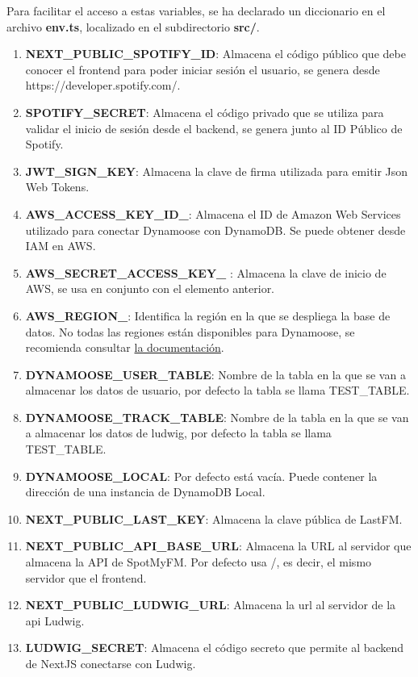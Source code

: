 Para facilitar el acceso a estas variables, se ha declarado un diccionario en el archivo \textbf{env.ts}, localizado en el subdirectorio \textbf{src/}.

\begin{enumerate}
    \item \textbf{NEXT\_PUBLIC\_SPOTIFY\_ID}: Almacena el código público que debe conocer el frontend para poder iniciar sesión el usuario, se genera desde https://developer.spotify.com/.
    \item \textbf{SPOTIFY\_SECRET}: Almacena el código privado que se utiliza para validar el inicio de sesión desde el backend, se genera junto al ID Público de Spotify. 
    \item \textbf{JWT\_SIGN\_KEY}: Almacena la clave de firma utilizada para emitir Json Web Tokens.
    \item \textbf{AWS\_ACCESS\_KEY\_ID\_}: Almacena el ID de Amazon Web Services utilizado para conectar Dynamoose con DynamoDB. Se puede obtener desde IAM en AWS.
    \item \textbf{AWS\_SECRET\_ACCESS\_KEY\_ }: Almacena la clave de inicio de AWS, se usa en conjunto con el elemento anterior.
    \item \textbf{AWS\_REGION\_}: Identifica la región en la que se despliega la base de datos. No todas las regiones están disponibles para Dynamoose, se recomienda consultar \href{https://docs.aws.amazon.com/AmazonRDS/latest/UserGuide/Concepts.RegionsAndAvailabilityZones.html}{la documentación}.
    \item \textbf{DYNAMOOSE\_USER\_TABLE}: Nombre de la tabla en la que se van a almacenar los datos de usuario, por defecto la tabla se llama TEST\_TABLE.
    \item \textbf{DYNAMOOSE\_TRACK\_TABLE}: Nombre de la tabla en la que se van a almacenar los datos de ludwig, por defecto la tabla se llama TEST\_TABLE.
    \item \textbf{DYNAMOOSE\_LOCAL}: Por defecto está vacía. Puede contener la dirección de una instancia de DynamoDB Local.
    \item \textbf{NEXT\_PUBLIC\_LAST\_KEY}: Almacena la clave pública de LastFM.
    \item \textbf{NEXT\_PUBLIC\_API\_BASE\_URL}: Almacena la URL al servidor que almacena la API de SpotMyFM. Por defecto usa /, es decir, el mismo servidor que el frontend.
    \item \textbf{NEXT\_PUBLIC\_LUDWIG\_URL}: Almacena la url al servidor de la api Ludwig.
    \item \textbf{LUDWIG\_SECRET}\label{env:ludwig_secret}: Almacena el código secreto que permite al backend de NextJS conectarse con Ludwig.
\end{enumerate}

